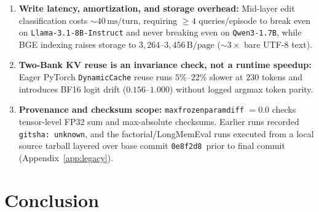 \documentclass[11pt]{article}
\newif\ifanonymous
\renewcommand{\_}{\origunderscore\allowbreak}
\begin{document}
\begin{enumerate}
    \item \textbf{Write latency, amortization, and storage overhead:} Mid-layer edit classification costs $\sim 40\,\text{ms/turn}$, requiring $\ge 4$ queries/episode to break even on \texttt{Llama-3.1-8B-Instruct} and never breaking even on \texttt{Qwen3-1.7B}, while BGE indexing raises storage to $3{,}264$--$3{,}456\,\text{B/page}$ ($\sim 3\times$ bare UTF-8 text).
    \item \textbf{Two-Bank KV reuse is an invariance check, not a runtime speedup:} Eager PyTorch \texttt{DynamicCache} reuse runs $5\%$--$22\%$ slower at $230$ tokens and introduces BF16 logit drift ($0.156$--$1.000$) without logged argmax token parity.
    \item \textbf{Provenance and checksum scope:} \texttt{max\_frozen\_param\_diff} $=0.0$ checks tensor-level FP32 sum and max-absolute checksums. Earlier runs recorded \texttt{git\_sha: unknown}, and the factorial/LongMemEval runs executed from a local source tarball layered over base commit \ifanonymous\texttt{[redacted for review]}\else\texttt{0e8f2d8}\fi\ prior to final commit (Appendix~\ref{app:legacy}).
\end{enumerate}

\section{Conclusion}
\label{sec:conclusion}
\end{document}
